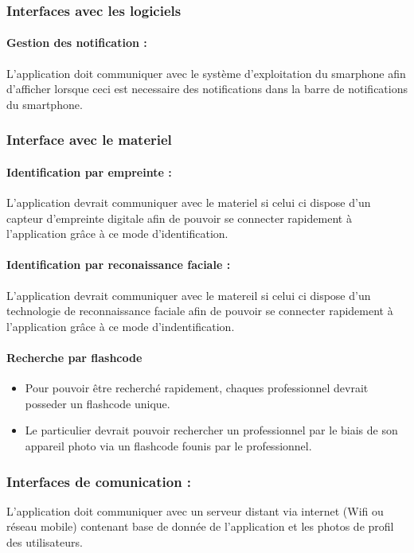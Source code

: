 \documentclass{article}
\begin{document}
\begin{itemize}
\subsubsection{Interfaces avec les logiciels}
\paragraph{Gestion des notification :}
L'application doit communiquer avec le système d'exploitation du
smarphone afin d'afficher lorsque ceci est necessaire des
notifications dans la barre de notifications du smartphone.

\subsubsection{Interface avec le materiel}
\paragraph{Identification par empreinte :}
L'application devrait communiquer avec le materiel si celui ci dispose
d'un capteur d'empreinte digitale afin de pouvoir se connecter rapidement à
l'application grâce à ce mode d'identification.
\paragraph{Identification par reconaissance faciale :}
L'application devrait communiquer avec le matereil si celui ci dispose
d'un technologie de reconnaissance faciale afin de pouvoir se
connecter rapidement à l'application grâce à ce mode
d'indentification.
\paragraph{Recherche par flashcode}
\begin{itemize}
\item Pour pouvoir être recherché rapidement, chaques professionnel
  devrait posseder un flashcode unique.
\item Le particulier devrait pouvoir rechercher un professionnel par le
  biais de son appareil photo via un flashcode founis par le
  professionnel.
\end{itemize}

\subsubsection{Interfaces de comunication :}
L'application doit communiquer avec un serveur distant via internet
(Wifi ou réseau mobile) contenant base de donnée de l'application et
les photos de profil des utilisateurs.



\end{itemize}
\end{document}
